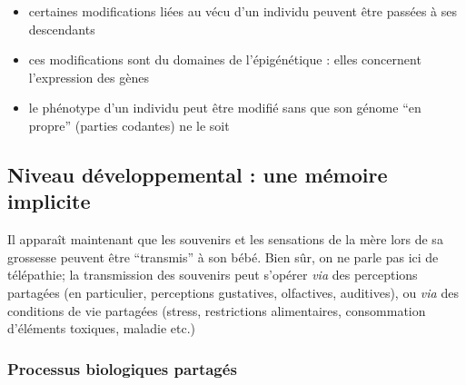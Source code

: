 \documentclass[french]{article}
\begin{document}
		
		\begin{itemize}
			\item certaines modifications liées au vécu d'un individu peuvent être passées à ses descendants
			\item ces modifications sont du domaines de l'épigénétique : elles concernent l'expression des gènes
			\item le phénotype d'un individu peut être modifié sans que son génome ``en propre'' (parties codantes) ne le soit
		\end{itemize}
		\subsection{Niveau développemental : une mémoire implicite}
			Il apparaît maintenant que les souvenirs et les sensations de la mère lors de sa grossesse peuvent être ``transmis'' à son bébé. Bien sûr, on ne parle pas ici de télépathie; la transmission des souvenirs peut s'opérer \textit{via} des perceptions partagées (en particulier, perceptions gustatives, olfactives, auditives), ou \textit{via} des conditions de vie partagées (stress, restrictions alimentaires, consommation d'éléments toxiques, maladie etc.)
			
			\subsubsection{Processus biologiques partagés}
\end{document}
